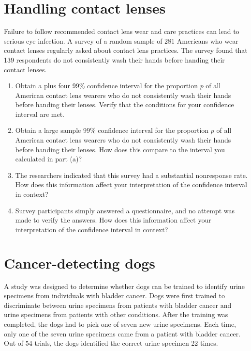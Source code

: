\documentclass[letterpaper,11pt,twoside,]{pinp}
\providecommand{\tightlist}{%
  \setlength{\itemsep}{0pt}\setlength{\parskip}{0pt}}
\begin{document}
\hypertarget{handling-contact-lenses}{%
\section{Handling contact lenses}\label{handling-contact-lenses}}

Failure to follow recommended contact lens wear and care practices can
lead to serious eye infection. A survey of a random sample of 281
Americans who wear contact lenses regularly asked about contact lens
practices. The survey found that 139 respondents do not consistently
wash their hands before handing their contact lenses.

\begin{enumerate}
\def\labelenumi{\alph{enumi}.}
\tightlist
\item
  Obtain a plus four 99\% confidence interval for the proportion \(p\)
  of all American contact lens wearers who do not consistently wash
  their hands before handing their lenses. Verify that the conditions
  for your confidence interval are met.
\item
  Obtain a large sample 99\% confidence interval for the proportion
  \(p\) of all American contact lens wearers who do not consistently
  wash their hands before handing their lenses. How does this compare to
  the interval you calculated in part (a)?
\item
  The researchers indicated that this survey had a substantial
  nonresponse rate. How does this information affect your interpretation
  of the confidence interval in context?
\item
  Survey participants simply answered a questionnaire, and no attempt
  was made to verify the answers. How does this information affect your
  interpretation of the confidence interval in context?
\end{enumerate}

\hypertarget{cancer-detecting-dogs}{%
\section{Cancer-detecting dogs}\label{cancer-detecting-dogs}}

A study was designed to determine whether dogs can be trained to
identify urine specimens from individuals with bladder cancer. Dogs were
first trained to discriminate between urine specimens from patients with
bladder cancer and urine specimens from patients with other conditions.
After the training was completed, the dogs had to pick one of seven new
urine specimens. Each time, only one of the seven urine specimens came
from a patient with bladder cancer. Out of 54 trials, the dogs
identified the correct urine specimen 22 times.
\end{document}
